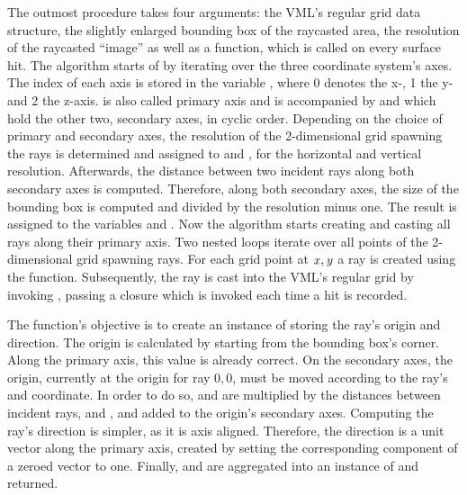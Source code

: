%
The outmost procedure  takes four arguments: the VML's regular grid data structure, the slightly enlarged bounding box of the raycasted area, the resolution of the raycasted \enquote{image} as well as a function, which is called on every surface hit.
The algorithm starts of by iterating over the three coordinate system's axes.
The index of each axis is stored in the variable , where 0 denotes the x-, 1 the y- and 2 the z-axis.
 is also called primary axis and is accompanied by  and  which hold the other two, secondary axes, in cyclic order.
Depending on the choice of primary and secondary axes, the resolution of the 2-dimensional grid spawning the rays is determined and assigned to  and , for the horizontal and vertical resolution.
Afterwards, the distance between two incident rays along both secondary axes is computed.
Therefore, along both secondary axes, the size of the bounding box is computed and divided by the resolution minus one.
The result is assigned to the variables  and .
Now the algorithm starts creating and casting all rays along their primary axis.
Two nested loops iterate over all points of the 2-dimensional grid spawning rays.
For each grid point at $\mathit{x}, \mathit{y}$ a ray is created using the  function.
Subsequently, the ray is cast into the VML's regular grid by invoking , passing a closure which is invoked each time a hit is recorded.

The  function's objective is to create an instance of  storing the ray's origin and direction.
The origin is calculated by starting from the bounding box's  corner.
Along the primary axis, this value is already correct.
On the secondary axes, the origin, currently at the origin for ray $0, 0$, must be moved according to the ray's  and  coordinate.
In order to do so,  and  are multiplied by the distances between incident rays,  and , and added to the origin's secondary axes.
%
Computing the ray's direction is simpler, as it is axis aligned.
Therefore, the direction is a unit vector along the primary axis, created by setting the corresponding component of a zeroed vector to one.
%
Finally,  and  are aggregated into an instance of  and returned.

